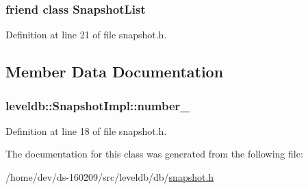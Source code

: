 \subsubsection[{Snapshot\+List}]{\setlength{\rightskip}{0pt plus 5cm}friend class {\bf Snapshot\+List}\hspace{0.3cm}{\ttfamily [friend]}}\label{classleveldb_1_1_snapshot_impl_abe14b2fb5e32159324c619e1a42327a0}


Definition at line 21 of file snapshot.\+h.



\subsection{Member Data Documentation}
\hypertarget{classleveldb_1_1_snapshot_impl_aa31dca969679d05d17c4c0eb1443a96e}{}
\subsubsection[{number\+\_\+}]{ leveldb\+::\+Snapshot\+Impl\+::number\+\_\+}\label{classleveldb_1_1_snapshot_impl_aa31dca969679d05d17c4c0eb1443a96e}


Definition at line 18 of file snapshot.\+h.



The documentation for this class was generated from the following file\+:\begin{DoxyCompactItemize}
\item 
/home/dev/ds-\/160209/src/leveldb/db/\hyperlink{snapshot_8h}{snapshot.\+h}\end{DoxyCompactItemize}
